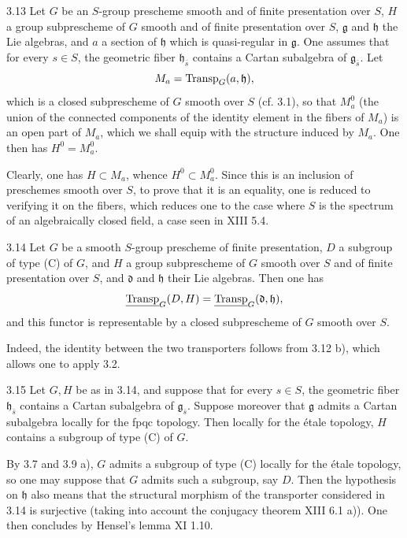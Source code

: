 \begin{corollary}{3.13}\label{XIV.3.13}
Let $G$ be an $S$-group prescheme smooth and of finite
presentation over $S$, $H$ a group subprescheme of
$G$ smooth and of finite presentation over $S$,
$\mathfrak g$ and $\mathfrak h$ the Lie algebras,
and $a$ a section of $\mathfrak h$ which is
quasi-regular in $\mathfrak g$. One assumes that
for every $s\in S$, the geometric fiber
$\mathfrak h_{\bar s}$ contains a Cartan subalgebra
of $\mathfrak g_{\bar s}$. Let
\[
 M_a=\operatorname{Transp}_G(a,\mathfrak h),
\]
which is a closed subprescheme of $G$ smooth over
$S$ (cf. 3.1), so that $M_a^0$ (the union of the
connected components of the identity element in
the fibers of $M_a$) is an open part of $M_a$,
which we shall equip with the structure induced
by $M_a$. One then has $H^0=M_a^0$.
\end{corollary}
Clearly, one has $H\subset M_a$, whence
$H^0\subset M_a^0$. Since this is an inclusion
of preschemes smooth over $S$, to prove that
it is an equality, one is reduced to verifying
it on the fibers, which reduces one to the
case where $S$ is the spectrum of an
algebraically closed field, a case seen in
XIII 5.4.

\begin{corollary}{3.14}\label{XIV.3.14}
Let $G$ be a smooth $S$-group prescheme of
finite presentation, $D$ a subgroup of type
(C) of $G$, and $H$ a group subprescheme of
$G$ smooth over $S$ and of finite presentation
over $S$, and $\mathfrak d$ and $\mathfrak h$
their Lie algebras. Then one has
\[
 \underline{\operatorname{Transp}}_G(D,H)=\underline{\operatorname{Transp}}_G(\mathfrak d,\mathfrak h),
\]
and this functor is representable by a
closed subprescheme of $G$ smooth over $S$.
\end{corollary}
Indeed, the identity between the two
transporters follows from 3.12 b), which
allows one to apply 3.2.

\begin{corollary}{3.15}\label{XIV.3.15}
Let $G,H$ be as in 3.14, and suppose that
for every $s\in S$, the geometric fiber
$\mathfrak h_{\bar s}$ contains a Cartan
subalgebra of $\mathfrak g_{\bar s}$. Suppose
moreover that $\mathfrak g$ admits a Cartan
subalgebra locally for the fpqc topology.
Then locally for the \'etale topology,
$H$ contains a subgroup of type (C) of $G$.
\end{corollary}
By 3.7 and 3.9 a), $G$ admits a subgroup
of type (C) locally for the \'etale topology,
so one may suppose that $G$ admits such
a subgroup, say $D$. Then the hypothesis
on $\mathfrak h$ also means that the
structural morphism of the transporter
considered in 3.14 is surjective (taking
into account the conjugacy theorem XIII
6.1 a)). One then concludes by Hensel's
lemma XI 1.10.

